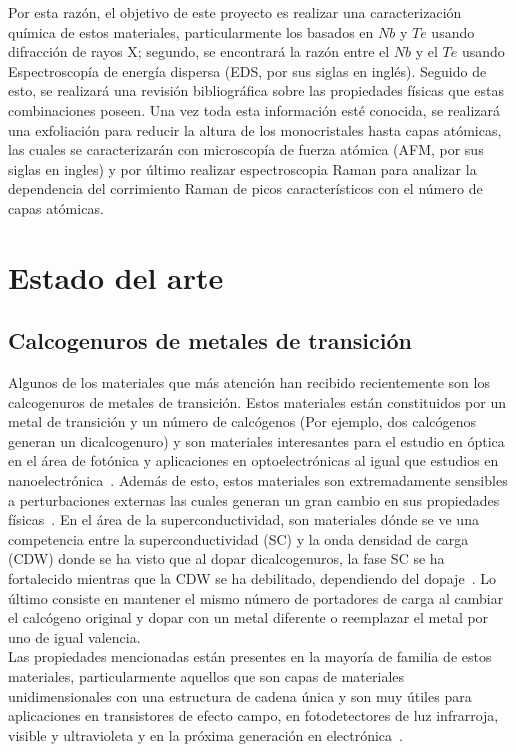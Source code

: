 \documentclass{article}
\begin{document}
Por esta razón, el objetivo de este proyecto es realizar una caracterización química de estos materiales, particularmente los basados en $Nb$ y $Te$ usando difracción de rayos X; segundo, se encontrará la razón entre el $Nb$ y el $Te$ usando  Espectroscopía de energía dispersa (EDS, por sus siglas en inglés). Seguido de esto, se realizará una revisión bibliográfica sobre las propiedades físicas que estas combinaciones poseen. Una vez toda esta información esté conocida, se realizará una exfoliación para reducir la altura de los monocristales hasta capas atómicas, las cuales se caracterizarán con microscopía de fuerza atómica (AFM, por sus siglas en ingles) y por último realizar espectroscopia Raman para analizar la dependencia del corrimiento Raman de picos característicos con el número de capas atómicas.

\section{Estado del arte}
\subsection{Calcogenuros de metales de transición}

Algunos de los materiales que más atención han recibido recientemente son los calcogenuros de metales de transición. Estos materiales están constituidos por un metal de transición y un número de calcógenos (Por ejemplo, dos calcógenos generan un dicalcogenuro) y son materiales interesantes para el estudio en óptica en el área de fotónica y aplicaciones en optoelectrónicas al igual que estudios en nanoelectrónica~\cite{dical}. Además de esto, estos materiales son extremadamente sensibles a perturbaciones externas las cuales generan un gran cambio en sus propiedades físicas~\cite{dical}. En el área de la superconductividad, son materiales dónde se ve una competencia entre la superconductividad (SC) y la onda densidad de carga (CDW) donde se ha visto que al dopar dicalcogenuros, la fase SC se ha fortalecido mientras que la CDW se ha debilitado, dependiendo del dopaje~\cite{Competition1}. Lo último consiste en mantener el mismo número de portadores de carga al cambiar el calcógeno original y dopar con un metal diferente o reemplazar el metal por uno de igual valencia.\\

Las propiedades mencionadas están presentes en la mayoría de familia de estos materiales, particularmente aquellos que son capas de materiales unidimensionales con una estructura de cadena única y son muy útiles para aplicaciones en transistores de efecto campo, en fotodetectores de luz infrarroja, visible y ultravioleta y en la próxima generación en electrónica~\cite{trical}.\\
\end{document}
